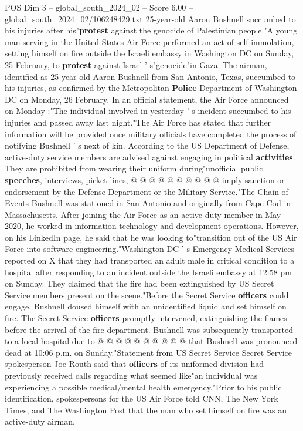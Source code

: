 \begin{textsample}{POS Dim 3 – global\_south\_2024\_02 – Score 6.00 – global\_south\_2024\_02/106248429.txt}  \label{ex:f3_pos_365}
25-year-old Aaron Bushnell succumbed to his injuries after his"\textbf{protest} against the genocide of Palestinian people."A young man serving in the United States Air Force performed an act of self-immolation, setting himself on fire outside the Israeli embassy in Washington DC on Sunday, 25 February, to \textbf{protest} against Israel ' s"genocide"in Gaza.
The airman, identified as 25-year-old Aaron Bushnell from San Antonio, Texas, succumbed to his injuries, as confirmed by the Metropolitan \textbf{Police} Department of Washington DC on Monday, 26 February.
In an official statement, the Air Force announced on Monday :"The individual involved in yesterday ' s incident succumbed to his injuries and passed away last night."The Air Force has stated that further information will be provided once military officials have completed the process of notifying Bushnell ' s next of kin.
According to the US Department of Defense, active-duty service members are advised against engaging in political \textbf{activities}.
They are prohibited from wearing their uniform during"unofficial public \textbf{speeches}, interviews, picket lines, @ @ @ @ @ @ @ @ @ @ imply sanction or endorsement by the Defense Department or the Military Service."The Chain of Events Bushnell was stationed in San Antonio and originally from Cape Cod in Massachusetts.
After joining the Air Force as an active-duty member in May 2020, he worked in information technology and development operations.
However, on his LinkedIn page, he said that he was looking to"transition out of the US Air Force into software engineering."Washington DC ' s Emergency Medical Services reported on X that they had transported an adult male in critical condition to a hospital after responding to an incident outside the Israeli embassy at 12:58 pm on Sunday.
They claimed that the fire had been extinguished by US Secret Service members present on the scene."Before the Secret Service \textbf{officers} could engage, Bushnell doused himself with an unidentified liquid and set himself on fire.
The Secret Service \textbf{officers} promptly intervened, extinguishing the flames before the arrival of the fire department.
Bushnell was subsequently transported to a local hospital due to @ @ @ @ @ @ @ @ @ @ that Bushnell was pronounced dead at 10:06 p.m. on Sunday."Statement from US Secret Service Secret Service spokesperson Joe Routh said that \textbf{officers} of its uniformed division had previously received calls regarding what seemed like"an individual was experiencing a possible medical/mental health emergency."Prior to his public identification, spokespersons for the US Air Force told CNN, The New York Times, and The Washington Post that the man who set himself on fire was an active-duty airman.

\end{textsample}
